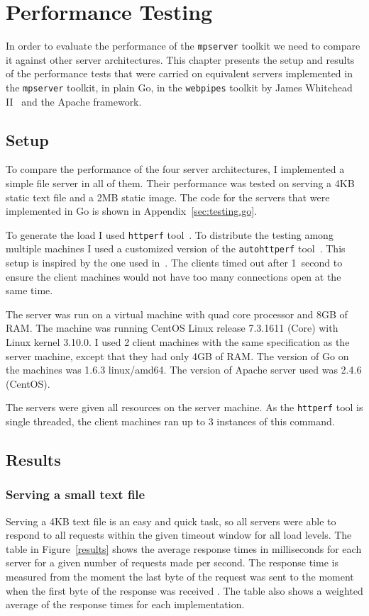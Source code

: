 \section{Performance Testing}
\label{sec:test}
In order to evaluate the performance of the \texttt{mpserver} toolkit we 
need to compare it against other server architectures.
This chapter presents the setup and results of the performance tests
that were carried on equivalent servers implemented in the \texttt{mpserver} toolkit,
in plain Go, in the \texttt{webpipes} toolkit by James Whitehead II~\cite{whitehead} 
and the Apache framework.

\subsection{Setup}
To compare the performance of the four server architectures, I 
implemented a simple file server in all of them. Their performance 
was tested on serving a 4KB static text file and a 2MB static image. 
The code for the servers that were implemented in Go is shown in Appendix~\ref{sec:testing.go}. 

To generate the load I used \texttt{httperf} tool~\cite{httperf}. To distribute 
the testing among multiple machines I used a customized version
of the \texttt{autohttperf} tool~\cite{whitehead}.
This setup is inspired by the one used in~\cite{whitehead}.
The clients timed out after 1~second to ensure the client machines would 
not have too many connections open at the same time.

The server was run on a virtual machine with quad core processor and 
8GB of RAM. The machine was running CentOS Linux release 7.3.1611 (Core)
with Linux kernel 3.10.0.
I used 2 client machines with the same specification as the server machine, 
except that they had only 4GB of RAM. The version of Go on the machines was
1.6.3 linux/amd64. The version of Apache server used was 2.4.6 (CentOS).

The servers were given all resources on the server machine. 
As the \texttt{httperf} tool is single threaded, the client machines 
ran up to 3 instances of this command.

\subsection{Results}
\subsubsection{Serving a small text file}
Serving a 4KB text file is an easy and quick task, so all servers were able to
respond to all requests within the given timeout window for all load levels.
The table in Figure~\ref{results} shows the average response times in milliseconds 
for each server for a given number of requests made per second. The response time is 
measured from the moment the last byte of the request was sent to the moment when the first 
byte of the response was received \cite{httperfdoc}. The table also shows a weighted 
average of the response times for each implementation.


